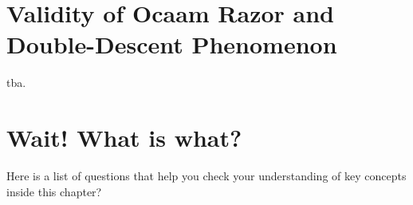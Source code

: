 \section{Validity of Ocaam Razor and Double-Descent Phenomenon}
\begin{boxedexample} \complementary{\theexample}
    \label{ex:double_descent}
    tba.
\end{boxedexample}

\section*{Wait! What is what?}
Here is a list of questions that help you check your understanding of key
concepts inside this chapter?

